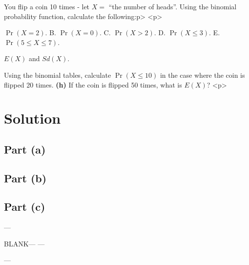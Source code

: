 





You flip a coin 10 times - let $X =$ ``the number of heads''. Using the binomial probability function, calculate the following:\<p>
<p>\item[(a)] $\Pr(X = 2)$. 
B.  $\Pr(X = 0)$. 
C.   $\Pr(X > 2)$. 
D.  $\Pr(X \le 3)$. 
E.  $\Pr(5 \le X \le 7)$.   \item[(f)] $E(X)$ and $Sd(X)$.  \item[(g)] Using the binomial tables, calculate $\Pr(X \le10)$ in the case where the coin is flipped 20 times.  {\bf(h)} If the coin is flipped 50 times, what is $E(X)$?
<p>


\section*{Solution}

\subsection*{Part (a)}

\subsection*{Part (b)}

\subsection*{Part (c)}	
---

BLANK---
---

---	